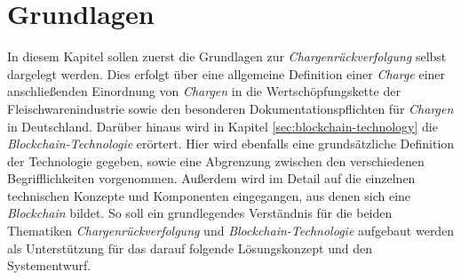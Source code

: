 \section{Grundlagen} \label{sec:basics}
In diesem Kapitel sollen zuerst die Grundlagen zur \textit{Chargenrückverfolgung} selbst dargelegt werden. Dies erfolgt über eine allgemeine Definition einer \textit{Charge} einer anschließenden Einordnung von \textit{Chargen} in die Wertschöpfungskette der Fleischwarenindustrie sowie den besonderen Dokumentationspflichten für \textit{Chargen} in Deutschland. Darüber hinaus wird in Kapitel \ref{sec:blockchain-technology} die \textit{Blockchain-Technologie} erörtert. Hier wird ebenfalls eine grundsätzliche Definition der Technologie gegeben, sowie eine Abgrenzung zwischen den verschiedenen Begrifflichkeiten vorgenommen. Außerdem wird im Detail auf die einzelnen technischen Konzepte und Komponenten eingegangen, aus denen sich eine \textit{Blockchain} bildet. So soll ein grundlegendes Verständnis für die beiden Thematiken \textit{Chargenrückverfolgung} und \textit{Blockchain-Technologie} aufgebaut werden als Unterstützung für das darauf folgende Lösungskonzept und den Systementwurf.





\newpage
